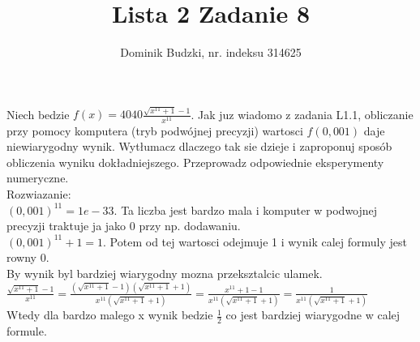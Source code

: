 \documentclass{article}
\title{Lista 2 Zadanie 8}
\author{Dominik Budzki, nr. indeksu 314625}
\begin{document}
\maketitle

Niech bedzie $f(x) = 4040\frac{\sqrt{x^{11}+1}-1}{x^{11}}$. Jak juz wiadomo
z zadania L1.1, obliczanie przy pomocy komputera (tryb podwójnej precyzji) wartosci
$f(0,001)$ daje niewiarygodny wynik. Wytłumacz dlaczego tak sie dzieje i zaproponuj
sposób obliczenia wyniku dokładniejszego. Przeprowadz odpowiednie eksperymenty
numeryczne.\\

Rozwiazanie:\\
$(0,001)^{11} = 1e-33$. Ta liczba jest bardzo mala i komputer w podwojnej precyzji traktuje ja jako 0 przy np. dodawaniu.\\
$(0,001)^{11} + 1 = 1$. Potem od tej wartosci odejmuje 1 i wynik calej formuly jest rowny 0.\\
By wynik byl bardziej wiarygodny mozna przeksztalcic ulamek.\\
$\frac{\sqrt{x^{11}+1}-1}{x^{11}} = \frac{(\sqrt{x^{11}+1}-1)(\sqrt{x^{11}+1}+1)}{x^{11}(\sqrt{x^{11}+1}+1)} = \frac{x^{11}+1-1}{x^{11}(\sqrt{x^{11}+1}+1)} = \frac{1}{x^{11}(\sqrt{x^{11}+1}+1)}$\\

Wtedy dla bardzo malego x wynik bedzie $\frac{1}{2}$ co jest bardziej wiarygodne w calej formule.
\end{document}
